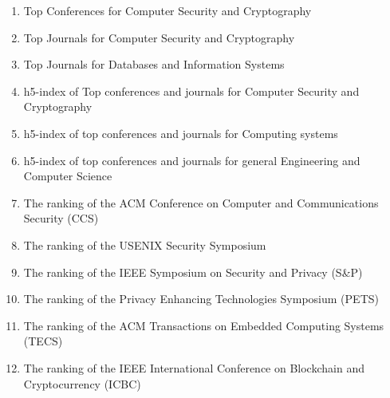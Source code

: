 \vspace{-7em}
\begin{enumerate}
	\item Top Conferences for Computer Security and Cryptography
	\item Top Journals for Computer Security and Cryptography
	\item Top Journals for Databases and Information Systems
	\item h5-index of Top conferences and journals for Computer Security and Cryptography
	\item h5-index of top conferences and journals for Computing systems
	\item h5-index of top conferences and journals for general Engineering and Computer Science
	\item The ranking of the ACM Conference on Computer and Communications Security (CCS)
	\item The ranking of the USENIX Security Symposium
	\item The ranking of the IEEE Symposium on Security and Privacy (S\&P)
	\item The ranking of the Privacy Enhancing Technologies Symposium (PETS)
	\item The ranking of the ACM Transactions on Embedded Computing Systems (TECS)
	\item The ranking of the IEEE International Conference on Blockchain and Cryptocurrency (ICBC)
   \end{enumerate}


